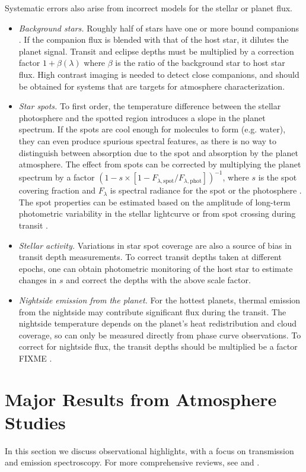 \documentclass[graybox,natbib,nosecnum]{svmult}
\begin{document}
Systematic errors also arise from incorrect models for the stellar or planet flux. 

\begin{itemize}
\item{\emph{Background stars.} Roughly half of stars have one or more bound companions \citep{raghavan10}. If the companion flux is blended with that of the host star, it dilutes the planet signal. Transit and eclipse depths must be multiplied by a correction factor $1 + \beta(\lambda)$ where $\beta$ is the ratio of the background star to host star flux. High contrast imaging is needed to detect close companions, and should be obtained for systems that are targets for atmosphere characterization.}
\item{\emph{Star spots.} To first order, the temperature difference between the stellar photosphere and the spotted region introduces a slope in the planet spectrum. If the spots are cool enough for molecules to form (e.g. water), they can even produce spurious spectral features, as there is no way to distinguish between absorption due to the spot and absorption by the planet atmosphere. The effect from spots can be corrected by multiplying the planet spectrum by a factor $(1-s\times[1-F_{\lambda,\mathrm{spot}}/F_{\lambda,\mathrm{phot}}])^{-1}$, where $s$ is the spot covering fraction and $F_\lambda$ is spectral radiance for the spot or the photosphere \citep{mccullough14}. The spot properties can be estimated based on the amplitude of long-term photometric variability in the stellar lightcurve or from spot crossing during transit \citep[e.g.][]{pont08}.} 
\item{\emph{Stellar activity.} Variations in star spot coverage are also a source of bias in transit depth measurements. To correct transit depths taken at different epochs, one can obtain photometric monitoring of the host star to estimate changes in $s$ and correct the depths with the above scale factor.} 
\item{\emph{Nightside emission from the planet.} For the hottest planets, thermal emission from the nightside may contribute significant flux during the transit. The nightside temperature depends on the planet's heat redistribution and cloud coverage, so can only be measured directly from phase curve observations. To correct for nightside flux, the transit depths should be multiplied be a factor FIXME \citep{kipping10}.} 
\end{itemize}

\section{Major Results from Atmosphere Studies}
In this section we discuss observational highlights, with a focus on transmission and emission spectroscopy.  For more comprehensive reviews, see \cite{crossfield15} and \cite{deming17}. %
\end{document}
